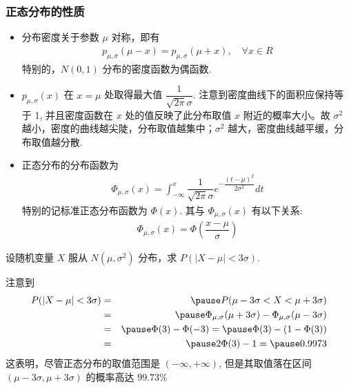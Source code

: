 \begin{frame}
	\frametitle{正态分布的性质}
	\begin{itemize}[<+-|alert@+>]
		\item 分布密度关于参数 $\mu$ 对称，即有
		      \begin{eqnarray*}
			      p_{\mu,\sigma}(\mu-x)=p_{\mu,\sigma}(\mu+x),  \quad \forall x \in R
		      \end{eqnarray*}
		      特别的，$N (0,1)$ 分布的密度函数为偶函数.
		\item $p_{\mu,\sigma}(x)$ 在 $x=\mu$ 处取得最大值 $\dfrac{1}{\sqrt{2\pi}\sigma}$. 注意到密度曲线下的面积应保持等于 1, 并且密度函数在 $x$ 处的值反映了此分布取值 $x$ 附近的概率大小。故 $\sigma^2$ 越小，密度的曲线越尖陡，分布取值越集中；$\sigma^2$ 越大，密度曲线越平缓，分布取值越分散.
		\item 正态分布的分布函数为
		      \begin{eqnarray*}
			      \Phi_{\mu,\sigma}(x)=\int_{-\infty}^x\dfrac{1}{\sqrt{2\pi}\sigma}e^{-\dfrac{(t-\mu)^2}{2\sigma^2}}dt
		      \end{eqnarray*}
		      特别的记标准正态分布函数为 $\Phi (x)$. 其与 $\Phi_{\mu,\sigma}(x)$ 有以下关系:
		      \begin{eqnarray*}
			      \Phi_{\mu,\sigma}(x)=\Phi(\dfrac{x-\mu}{\sigma})
		      \end{eqnarray*}
	\end{itemize}
\end{frame}
\begin{frame}
	\begin{exam}[3$\sigma$ 原则] 设随机变量 $X$ 服从 $N (\mu,\sigma^2)$ 分布，求 $P (|X-\mu|<3\sigma)$.
	\end{exam}

	\pause \jieda 注意到
	\begin{eqnarray*}
		P(|X-\mu|<3\sigma)&=&\pause P(\mu-3\sigma<X<\mu+3\sigma)\\
		&=&\pause \Phi_{\mu,\sigma}(\mu+3\sigma)-\Phi_{\mu,\sigma}(\mu-3\sigma)\\
		&=&\pause \Phi(3)-\Phi(-3)=\pause \Phi(3)-(1-\Phi(3))\\
		&=&\pause 2\Phi(3)-1=\pause 0.9973
	\end{eqnarray*}
	\pause 这表明，尽管正态分布的取值范围是 $(-\infty,+\infty)$, 但是其取值落在区间 $(\mu-3\sigma,\mu+3\sigma)$ 的概率高达 $99.73\%$


\end{frame}
